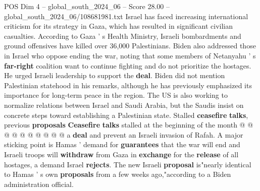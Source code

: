 \begin{textsample}{POS Dim 4 – global\_south\_2024\_06 – Score 28.00 – global\_south\_2024\_06/108681981.txt}
Israel has faced increasing international criticism for its strategy in Gaza, which has resulted in significant civilian casualties.
According to Gaza ' s Health Ministry, Israeli bombardments and ground offensives have killed over 36,000 Palestinians.
Biden also addressed those in Israel who oppose ending the war, noting that some members of Netanyahu ' s \textbf{far-right} coalition want to continue fighting and do not prioritize the hostages.
He urged Israeli leadership to support the \textbf{deal}.
Biden did not mention Palestinian statehood in his remarks, although he has previously emphasized its importance for long-term peace in the region.
The US is also working to normalize relations between Israel and Saudi Arabia, but the Saudis insist on concrete steps toward establishing a Palestinian state.
Stalled \textbf{ceasefire} \textbf{talks}, previous \textbf{proposals} \textbf{Ceasefire} \textbf{talks} stalled at the beginning of the month @ @ @ @ @ @ @ @ @ @ a \textbf{deal} and prevent an Israeli invasion of Rafah.
A major sticking point is Hamas ' demand for \textbf{guarantees} that the war will end and Israeli troops will \textbf{withdraw} from Gaza in \textbf{exchange} for the \textbf{release} of all hostages, a demand Israel \textbf{rejects}.
The new Israeli \textbf{proposal} is"nearly identical to Hamas ' s own \textbf{proposals} from a few weeks ago,"according to a Biden administration official.

\end{textsample}

